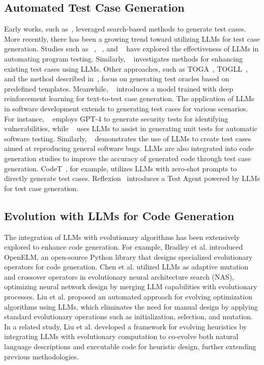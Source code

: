 \subsection{Automated Test Case Generation}
Early works, such as~\cite{fraser2011evosuite}, leveraged search-based methods to generate test cases.
More recently, there has been a growing trend toward utilizing LLMs for test case generation.
Studies such as ~\cite{siddiq2024using}, ~\cite{guilherme2023initial}, and ~\cite{schafer2023empirical} have explored the effectiveness of LLMs in automating program testing.
Similarly, ~\cite{alshahwan2024automated} investigates methods for enhancing existing test cases using LLMs.
Other approaches, such as TOGA~\cite{dinella2022toga}, TOGLL~\cite{hossain2024togll}, and the method described in~\cite{hossain2023neural}, 
focus on generating test oracles based on predefined templates.
Meanwhile, ~\cite{takerngsaksiri2024tdd} introduces a model trained with deep reinforcement learning for text-to-test case generation.
The application of LLMs in software development extends to generating test cases for various scenarios.
For instance, ~\cite{zhang2023well} employs GPT-4 to generate security tests for identifying vulnerabilities, while ~\cite{schafer2023empirical} uses LLMs to assist in generating unit tests for automatic software testing.
Similarly, ~\cite{kang2023large} demonstrates the use of LLMs to create test cases aimed at reproducing general software bugs.
LLMs are also integrated into code generation studies to improve the accuracy of generated code through test case generation.
CodeT~\cite{chen2022codet}, for example, utilizes LLMs with zero-shot prompts to directly generate test cases. Reflexion~\cite{shinn2024reflexion} introduces a Test Agent powered by LLMs for test case generation.


\subsection{Evolution with LLMs for Code Generation}
The integration of LLMs with evolutionary algorithms has been extensively explored to enhance code generation.
For example, Bradley et al. \cite{bradley2024openelm} introduced OpenELM, an open-source Python library that designs specialized evolutionary operators for code generation.
Chen et al. \cite{chen2023evoprompting} utilized LLMs as adaptive mutation and crossover operators in evolutionary neural architecture search (NAS),
optimizing neural network design by merging LLM capabilities with evolutionary processes.
Liu et al. \cite{liu2023algorithm} proposed an automated approach for evolving optimization algorithms using LLMs, which eliminates the need for manual design by applying standard evolutionary operations such as initialization, selection, and mutation.
In a related study, Liu et al. \cite{liu2024evolution} developed a framework for evolving heuristics by integrating LLMs with evolutionary computation to co-evolve both natural language descriptions and executable code for heuristic design, further extending previous methodologies.

